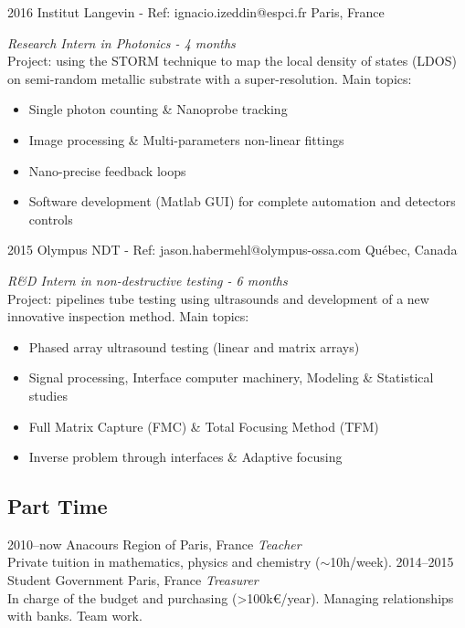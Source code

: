 \documentclass[]{friggeri-cv} %
\begin{document}
\begin{entrylist}


\entry
{2016}
{Institut Langevin - Ref: ignacio.izeddin@espci.fr}
{Paris, France}
{\emph{Research Intern in Photonics - 4 months} \\
Project: using the STORM technique to map the local density of states (LDOS) on semi-random metallic substrate with a super-resolution. Main topics:
\begin{itemize}
\item Single photon counting \& Nanoprobe tracking
\item Image processing \& Multi-parameters non-linear fittings
\item Nano-precise feedback loops 
\item Software development (Matlab GUI) for complete automation and detectors controls
\end{itemize}}

\entry
{2015}
{Olympus NDT - Ref: jason.habermehl@olympus-ossa.com}
{Québec, Canada}
{\emph{R\&D Intern in non-destructive testing - 6 months} \\
	Project: pipelines tube testing using ultrasounds and development of a new innovative inspection method. Main topics:
	\begin{itemize}
\item Phased array ultrasound testing (linear and matrix arrays)
\item Signal processing, Interface computer machinery, Modeling \& Statistical studies
\item Full Matrix Capture (FMC) \& Total Focusing Method (TFM)
\item Inverse problem through interfaces \& Adaptive focusing
	\end{itemize}}

\end{entrylist}

\subsection{Part Time}

\begin{entrylist}

\entry
{2010--now}
{Anacours}
{Region of Paris, France}
{\emph{Teacher} \\
Private tuition in mathematics, physics and chemistry ($\sim$10h/week).}
\entry
{2014--2015}
{Student Government}
{Paris, France}
{\emph{Treasurer} \\
In charge of the budget and purchasing (>100k€/year). Managing relationships with banks. Team work.}


\end{entrylist}
\end{document}
